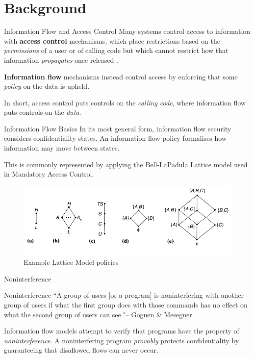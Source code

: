 \section{Background}

\begin{frame}{Information Flow and Access Control}
	Many systems control access to information with \textbf{access control} mechanisms, which place restrictions based on the \textit{permissions} of a user or of calling code but which cannot restrict how that information \textit{propagates} once released \cite{ifbackground:sabelfeld}.
	
	\textbf{Information flow} mechanisms instead control access by enforcing that some \textit{policy} on the data is upheld.
	
	In short, access control puts controls on the \textit{calling code}, where information flow puts controls on the \textit{data}.
\end{frame}

\begin{frame}{Information Flow Basics}
	In its most general form, information flow security considers confidentiality states. An information flow policy formalises how information may move between states.
	
	This is commonly represented by applying the Bell-LaPadula Lattice model used in Mandatory Access Control.
	
	\begin{figure}
		\includegraphics[scale=0.45]{content/images/lattice_examples.png}
		\caption{Example Lattice Model policies \cite{ifbackground:sandhu}}
	\end{figure}
	
\end{frame}

\begin{frame}{Noninterference}
	\begin{block}{Noninterference}
		``A group of users [or a program] is noninterfering with another group of users if what the first group does with those commands has no effect on what the second group of users can see."\newline \tiny{-- Goguen \& Meseguer} \cite{ifbackground:goguen}
	\end{block}
	
	Information flow models attempt to verify that programs have the property of \textit{noninterference}. A noninterfering program \textit{provably} protects confidentiality by guaranteeing that disallowed flows can never occur.
\end{frame}

